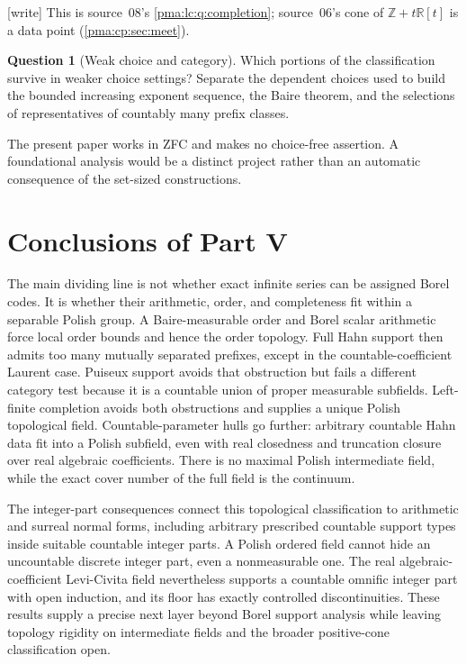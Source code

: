\documentclass[11pt]{article}
\numberwithin{equation}{section}
\theoremstyle{definition}
\newtheorem{question}[question]{Question}
\theoremstyle{remark}
\newcommand{\Z}{\mathbb Z}
\newcommand{\R}{\mathbb R}
\newcommand{\writetag}{\textup{\textsf{\small[write]}}}
\begin{document}
\noindent\writetag{} This is source~08's \cref{pma:lc:q:completion}; source~06's
cone of $\Z+t\R[t]$ is a data point (\cref{pma:cp:sec:meet}).

\begin{question}[Weak choice and category]
Which portions of the classification survive in weaker choice settings?
Separate the dependent choices used to build the bounded increasing exponent
sequence, the Baire theorem, and the selections of representatives of
countably many prefix classes.
\end{question}
The present paper works in ZFC and makes no choice-free assertion. A
foundational analysis would be a distinct project rather than an automatic
consequence of the set-sized constructions.

\section{Conclusions of Part V}

The main dividing line is not whether exact infinite series can be assigned
Borel codes. It is whether their arithmetic, order, and completeness fit
within a separable Polish group.
A Baire-measurable order and Borel scalar arithmetic force local order bounds
and hence the order topology. Full Hahn support then admits too many
mutually separated prefixes, except in the countable-coefficient Laurent
case. Puiseux support avoids that obstruction but fails a different category
test because it is a countable union of proper measurable subfields.
Left-finite completion avoids both obstructions and supplies a unique Polish
topological field. Countable-parameter hulls go further: arbitrary countable
Hahn data fit into a Polish subfield, even with real closedness and truncation
closure over real algebraic coefficients. There is no maximal Polish
intermediate field, while the exact cover number of the full field is the
continuum.

The integer-part consequences connect this topological classification to
arithmetic and surreal normal forms, including arbitrary prescribed countable
support types inside suitable countable integer parts. A Polish ordered field cannot hide an
uncountable discrete integer part, even a nonmeasurable one. The real
algebraic-coefficient Levi-Civita field nevertheless supports a countable
omnific integer part with open induction, and its floor has exactly
controlled discontinuities. These results supply a precise next layer beyond
Borel support analysis while leaving topology rigidity on intermediate fields and the broader
positive-cone classification open.
\end{document}
